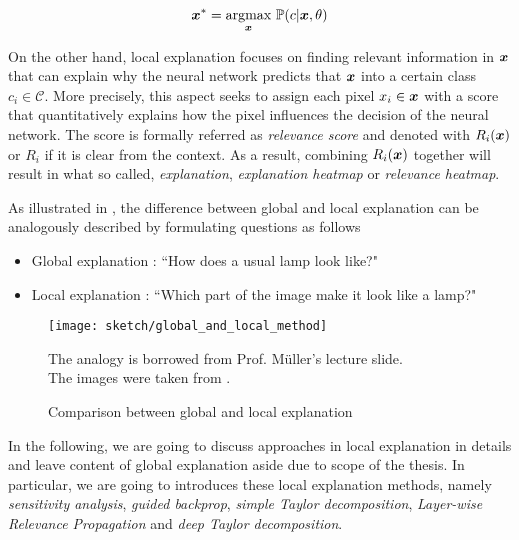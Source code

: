 \begin{align}
\patvector{x}^*  = \patarg{max}{\patvector{x}}  \mathbb{P}( c |\patvector{x},\theta)
\end{align}


On the other hand, local explanation focuses on finding relevant information in $\patvector{x}$ that can explain why the neural network predicts that $\boldsymbol{x}$ into a certain class $c_i \in \mathcal{C}$.  More precisely, this aspect seeks to assign each pixel $x_i \in \patvector{x}$ with a score that quantitatively explains how the pixel influences the decision of the neural network. The score is formally referred as \textit{relevance score} and denoted with $R_i(\boldsymbol{x})$ or $R_i$ if it is clear from the context. As a result, combining $R_i(\boldsymbol{x})$ together will result in what so called, \textit{explanation}, \textit{explanation heatmap} or \textit{relevance heatmap}.

As illustrated in \addfigure{\ref{fig:comparision_between_global_and_local_analysis}}, the difference between global and local explanation can be analogously described by formulating questions as follows
\begin{itemize}
	\item Global explanation : ``How does a usual lamp look like?"
    \item Local explanation : ``Which part of the image make it look like a lamp?" 
\end{itemize}

 \begin{figure}[!hbt]
\centering
\texttt{[image: sketch/global\_and\_local\_method]}
\caption{Comparison between global and local explanation}
\small{
The analogy is borrowed from Prof. M\"{u}ller's lecture slide. \\The images were taken from \cite{NguyenSynthesizingpreferredinputs2016a, BachPixelWiseExplanationsNonLinear2015}.
}
\label{fig:comparision_between_global_and_local_analysis}
\end{figure}

In the following, we are going to discuss approaches in local explanation in details and leave content of global explanation aside due to scope of the thesis. In particular, we are going to introduces these local explanation methods, namely \textit{sensitivity analysis}, \textit{guided backprop}, \textit{simple Taylor decomposition}, \textit{Layer-wise Relevance Propagation} and \textit{deep Taylor decomposition}.


